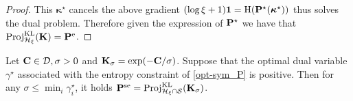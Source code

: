 \begin{proof}
This $\bm{\kappa}^\star$ cancels the above gradient \ie $(\log \xi + 1 )\bm{1} = \operatorname{H}({\mathbf{P}}^\star(\bm{\kappa}^\star))$ thus solves the dual problem. Therefore given the expression of ${\mathbf{P}}^\star$ we have that $\operatorname{Proj}^{\operatorname{\operatorname{KL}}}_{\mathcal{H}_{\xi}}(\mathbf{K}) = {\mathbf{P}}^{\mathrm{e}}$.
\end{proof}

\begin{lemma}\label{lemma_sea_proj}
Let $\mathbf{C} \in \mathcal{D}, \sigma >0$ and $\mathbf{K}_\sigma = \exp(-\mathbf{C}/\sigma)$. Suppose that the optimal dual variable $\gamma^\star$ associated with the entropy constraint of \eqref{opt-sym_P} is positive. Then for any $\sigma \leq \min_i \gamma^\star_i$, it holds ${\mathbf{P}}^{\mathrm{se}} = \operatorname{Proj}^{\operatorname{\operatorname{KL}}}_{\mathcal{H}_{\xi} \cap
  \mathcal{S}}(\mathbf{K}_{\sigma})$.
\end{lemma}


